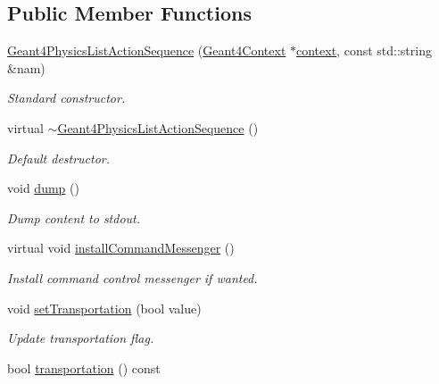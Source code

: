 \subsection*{Public Member Functions}
\begin{DoxyCompactItemize}
\item 
\hyperlink{class_d_d4hep_1_1_simulation_1_1_geant4_physics_list_action_sequence_a968d2371267ba0f87b7fa60d7f855ffe}{Geant4\+Physics\+List\+Action\+Sequence} (\hyperlink{class_d_d4hep_1_1_simulation_1_1_geant4_context}{Geant4\+Context} $\ast$\hyperlink{class_d_d4hep_1_1_simulation_1_1_geant4_action_aa9d87f0ec2a72b7fc2591b18f98d75cf}{context}, const std\+::string \&nam)
\begin{DoxyCompactList}\small\item\em Standard constructor. \end{DoxyCompactList}\item 
virtual \hyperlink{class_d_d4hep_1_1_simulation_1_1_geant4_physics_list_action_sequence_a2b2989ac26194d0579cf02256fbe70f8}{$\sim$\+Geant4\+Physics\+List\+Action\+Sequence} ()
\begin{DoxyCompactList}\small\item\em Default destructor. \end{DoxyCompactList}\item 
void \hyperlink{class_d_d4hep_1_1_simulation_1_1_geant4_physics_list_action_sequence_a15c69e0f4c07f3188c37c7732f6ff6c7}{dump} ()
\begin{DoxyCompactList}\small\item\em Dump content to stdout. \end{DoxyCompactList}\item 
virtual void \hyperlink{class_d_d4hep_1_1_simulation_1_1_geant4_physics_list_action_sequence_a9c60c66de8a46726b0b3d781042c22a6}{install\+Command\+Messenger} ()
\begin{DoxyCompactList}\small\item\em Install command control messenger if wanted. \end{DoxyCompactList}\item 
void \hyperlink{class_d_d4hep_1_1_simulation_1_1_geant4_physics_list_action_sequence_a0572d68ab6ffc8a826a84a4ae56f4327}{set\+Transportation} (bool value)
\begin{DoxyCompactList}\small\item\em Update transportation flag. \end{DoxyCompactList}\item 
bool \hyperlink{class_d_d4hep_1_1_simulation_1_1_geant4_physics_list_action_sequence_a93499b47b96e1183341c406390dca646}{transportation} () const

\end{DoxyCompactItemize}
